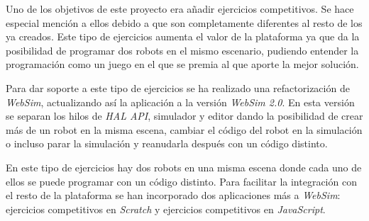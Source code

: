 Uno de los objetivos de este proyecto era añadir ejercicios competitivos. Se hace especial mención a ellos debido a que son completamente diferentes al resto de los ya creados. Este tipo de ejercicios aumenta el valor de la plataforma ya que da la posibilidad de programar dos robots en el mismo escenario, pudiendo entender la programación como un juego en el que se premia al que aporte la mejor solución.

 Para dar soporte a este tipo de ejercicios se ha realizado una refactorización de \textit{WebSim}, actualizando así la aplicación a la versión \textit{WebSim 2.0}. En esta versión se separan los hilos de \textit{HAL API}, simulador y editor dando la posibilidad de crear más de un robot en la misma escena, cambiar el código del robot en la simulación o incluso parar la simulación y reanudarla después con un código distinto. \newline

En este tipo de ejercicios hay dos robots en una misma escena donde cada uno de ellos se puede programar con un código distinto. Para facilitar la integración con el resto de la plataforma se han incorporado dos aplicaciones más a \textit{WebSim}: ejercicios competitivos en \textit{Scratch} y ejercicios competitivos en \textit{JavaScript}. \newline


